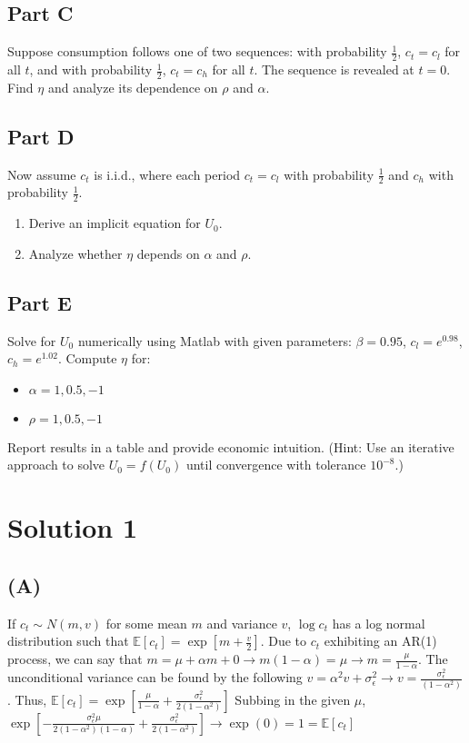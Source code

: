 \documentclass[10pt,a4paper]{article}
\begin{document}
  \subsection*{Part C}
    Suppose consumption follows one of two sequences: with probability $\frac{1}{2}$, $c_t = c_l$ for all $t$, and with probability $\frac{1}{2}$, $c_t = c_h$ for all $t$. The sequence is revealed at $t = 0$. Find $\eta$ and analyze its dependence on $\rho$ and $\alpha$.

  \subsection*{Part D}
    Now assume $c_t$ is i.i.d., where each period $c_t = c_l$ with probability $\frac{1}{2}$ and $c_h$ with probability $\frac{1}{2}$.
    \begin{enumerate}
        \item Derive an implicit equation for $U_0$.
        \item Analyze whether $\eta$ depends on $\alpha$ and $\rho$.
    \end{enumerate}

  \subsection*{Part E}
    Solve for $U_0$ numerically using Matlab with given parameters: $\beta = 0.95$, $c_l = e^{0.98}$, $c_h = e^{1.02}$. Compute $\eta$ for:
    \begin{itemize}
        \item $\alpha = 1, 0.5, -1$
        \item $\rho = 1, 0.5, -1$
    \end{itemize}
    Report results in a table and provide economic intuition.
    (Hint: Use an iterative approach to solve $U_0 = f(U_0)$ until convergence with tolerance $10^{-8}$.)
\section{Solution 1}
  \subsection*{(A)}
    If $c_t\sim N(m,v)$ for some mean $m$ and variance $v$, $\log c_t$ has a log normal distribution such that $\mathbb{E}[c_t] = \exp[m + \frac{v}{2}]$. Due to $c_t$ exhibiting an AR(1) process, we can say that $m = \mu + \alpha m + 0\rightarrow m(1-\alpha) = \mu\rightarrow m = \frac{\mu}{1-\alpha}$. The unconditional variance can be found by the following $v = \alpha^2v + \sigma_{\epsilon}^2\rightarrow v=\frac{\sigma_{\epsilon}^2}{(1-\alpha^2)}$. Thus, $\mathbb{E}[c_t] = \exp[\frac{\mu}{1-\alpha} + \frac{\sigma_{\epsilon}^2}{2(1-\alpha^2)}]$ Subbing in the given $\mu$, $ \exp[-\frac{\sigma_{\epsilon}^2\mu}{2(1-\alpha^2)(1-\alpha)} + \frac{\sigma_{\epsilon}^2}{2(1-\alpha^2)}]\rightarrow\exp(0) = 1 = \mathbb{E}[c_t]$   
\end{document}
